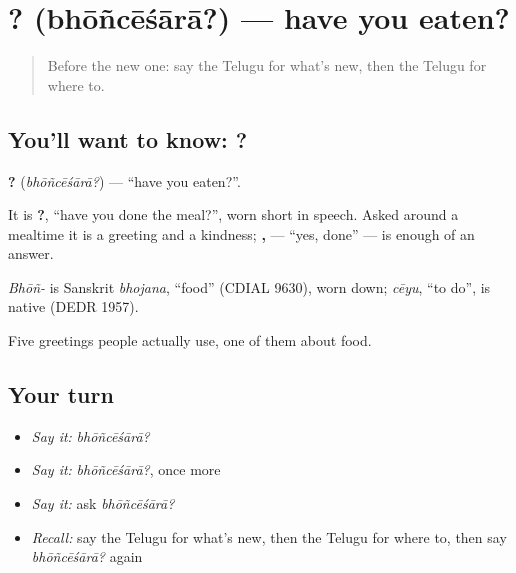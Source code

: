 \section[\texorpdfstring{\te{భోంచేశారా}? (bhōñcēśārā?)}{భోంచేశారా? (bhōñcēśārā?)}]{? (bhōñcēśārā?) — have you eaten?}

\label{lesson:TE-C91-eaten}



\begin{quote}
Before the new one: say the Telugu for what's new, then the Telugu for where to.
\end{quote}

\subsection*{You'll want to know: ?}
\textbf{?} (\emph{bhōñcēśārā?}) — \textquotedblleft{}have you eaten?\textquotedblright{}.

It is \textbf{ ?}, \textquotedblleft{}have you done the meal?\textquotedblright{}, worn short in speech. Asked around a mealtime it is a greeting and a kindness; \textbf{, } — \textquotedblleft{}yes, done\textquotedblright{} — is enough of an answer.

\begin{cousinweb}
\emph{Bhōñ-} is Sanskrit \emph{bhojana}, \textquotedblleft{}food\textquotedblright{} (CDIAL 9630), worn down; \emph{cēyu}, \textquotedblleft{}to do\textquotedblright{}, is native (DEDR 1957).
\end{cousinweb}

\begin{grammarlens}[title={What you've built}]
Five greetings people actually use, one of them about food.
\end{grammarlens}

\subsection*{Your turn}
\begin{itemize}
\raggedright
  \item \emph{Say it:} \emph{bhōñcēśārā?}
  \item \emph{Say it:} \emph{bhōñcēśārā?}, once more
  \item \emph{Say it:} ask \emph{bhōñcēśārā?}
  \item \emph{Recall:} say the Telugu for what's new, then the Telugu for where to, then say \emph{bhōñcēśārā?} again
\end{itemize}

